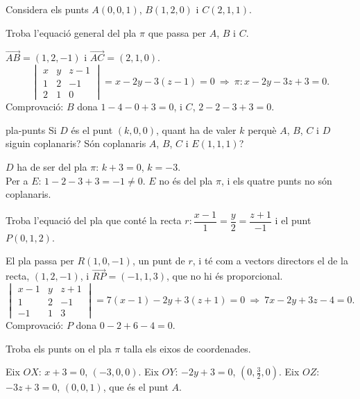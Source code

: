 Considera els punts $A(0,0,1)$, $B(1,2,0)$ i $C(2,1,1)$.

\begin{apartats}

Troba l'equació general del pla $\pi$ que passa per $A$, $B$ i $C$.

\begin{solucio}
$\overrightarrow{AB}=(1,2,-1)$ i $\overrightarrow{AC}=(2,1,0)$.
\[
\begin{vmatrix}x&y&z-1\\1&2&-1\\2&1&0\end{vmatrix}=x-2y-3(z-1)=0
\ \Longrightarrow\ \pi\colon x-2y-3z+3=0.
\]
Comprovació: $B$ dona $1-4-0+3=0$, i $C$, $2-2-3+3=0$.
\end{solucio}

\begin{tria}{pla-punts}
Si $D$ és el punt $(k,0,0)$, quant ha de valer $k$ perquè $A$, $B$, $C$ i $D$ siguin coplanaris? Són
coplanaris $A$, $B$, $C$ i $E(1,1,1)$?

\begin{solucio}
$D$ ha de ser del pla $\pi$: $k+3=0$, $k=-3$.\\
Per a $E$: $1-2-3+3=-1\ne0$. $E$ no és del pla $\pi$, i els quatre punts no són coplanaris.
\end{solucio}

Troba l'equació del pla que conté la recta $r\colon\dfrac{x-1}{1}=\dfrac{y}{2}=\dfrac{z+1}{-1}$ i el punt
$P(0,1,2)$.

\begin{solucio}
El pla passa per $R(1,0,-1)$, un punt de $r$, i té com a vectors directors el de la recta,
$(1,2,-1)$, i $\overrightarrow{RP}=(-1,1,3)$, que no hi és proporcional.
\[
\begin{vmatrix}x-1&y&z+1\\1&2&-1\\-1&1&3\end{vmatrix}=7(x-1)-2y+3(z+1)=0
\ \Longrightarrow\ 7x-2y+3z-4=0.
\]
Comprovació: $P$ dona $0-2+6-4=0$.
\end{solucio}
\end{tria}

\begin{nomesllarg}
Troba els punts on el pla $\pi$ talla els eixos de coordenades.

\begin{solucio}
Eix $OX$: $x+3=0$, $(-3,0,0)$. Eix $OY$: $-2y+3=0$, $\left(0,\frac32,0\right)$. Eix $OZ$: $-3z+3=0$,
$(0,0,1)$, que és el punt $A$.
\end{solucio}
\end{nomesllarg}

\end{apartats}
